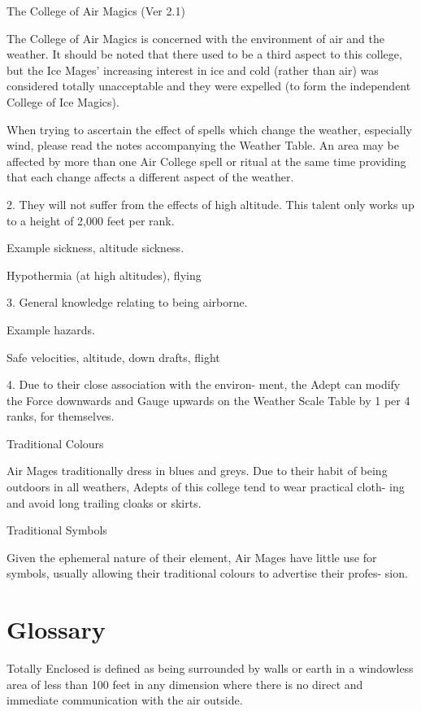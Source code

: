 \begin{Chapter}{The College of Air Magics (Ver 2.1)}

The College of Air Magics is concerned with the environment of air and
the weather.  It should be noted that there used to be a third aspect
to this college, but the Ice Mages’ increasing interest in ice and
cold (rather than air) was considered totally unacceptable and they
were expelled (to form the independent College of Ice Magics).

When trying to ascertain the effect of spells which change the
weather, especially wind, please read the notes accompanying the
Weather Table.  An area may be affected by more than one Air College
spell or ritual at the same time providing that each change affects a
different aspect of the weather.

2.  They  will  not  suffer  from  the  effects  of  high 
altitude.  This  talent  only  works  up  to  a  height  of 
2,000 feet per rank. 

Example 
sickness, altitude sickness. 

Hypothermia  (at  high  altitudes),  flying 

3. General knowledge relating to being airborne. 

Example 
hazards. 

Safe velocities, altitude, down drafts, flight 

4.  Due  to  their  close  association  with  the  environ-
ment, the  Adept  can  modify  the  Force  downwards 
and Gauge upwards on the Weather Scale Table by 
1 per 4 ranks, for themselves. 

Traditional Colours 


Air  Mages  traditionally  dress  in  blues  and  greys. 
Due to their habit of being outdoors in all weathers, 
Adepts of this college tend to wear practical cloth-
ing and avoid long trailing cloaks or skirts. 

Traditional Symbols 

Given  the  ephemeral  nature  of  their  element,  Air 
Mages have little use for symbols, usually allowing 
their  traditional  colours  to  advertise  their  profes-
sion. 

\section{Glossary}

Totally Enclosed is defined as being surrounded by 
walls or earth in a windowless area of less than 100 
feet in any dimension where there is  no direct and 
immediate communication with the air outside. 


\end{Chapter}
